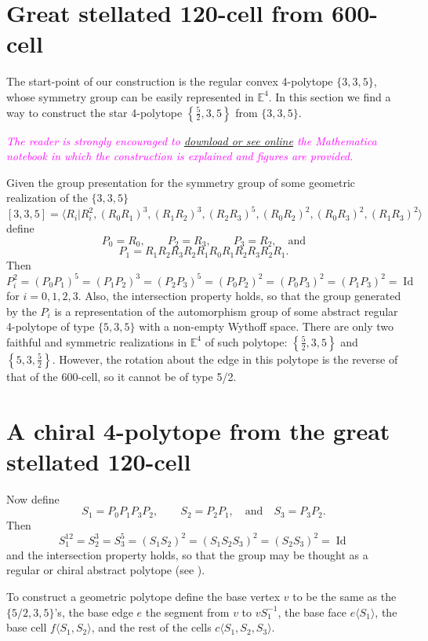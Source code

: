 \documentclass[spanish]{article}
\theoremstyle{definition}
\newcommand{\E}{\mathbb{E}}
\DeclareMathOperator{\Id}{Id}
\begin{document}
	\section{Great stellated 120-cell from 600-cell}
	The start-point of our construction is the regular convex 4-polytope $\{3,3,5\}$, whose symmetry group can be easily represented in $\E^4$.  In this section we find a way to construct the star 4-polytope $\left\{\frac{5}{2},3,5\right\}$ from $\{3,3,5\}$.
	
	\textcolor{magenta}{\textit{The reader is strongly encouraged to \href{https://www.wolframcloud.com/obj/dangcasanova/Published/chiral-4polytope.nb}{download or see online} the Mathematica notebook in which the construction is explained and figures are provided.}}
	
	Given the group presentation for the symmetry group of some geometric realization of the $\{3,3,5\}$
		\[[3,3,5]=\langle R_i|R_i^2,(R_0R_1)^3,(R_1R_2)^3,(R_2R_3)^5,(R_0R_2)^2,(R_0R_3)^2,(R_1R_3)^2\rangle\]
	define
		\[P_0=R_0,\qquad P_2=R_3,\qquad P_3=R_2,\quad\text{and}\]
		\[P_1=R_1R_2R_3R_2R_1R_0R_1R_2R_3R_2R_1.\]
	Then
		\[ P_i^2=(P_0P_1)^5=(P_1P_2)^3=(P_2P_3)^5=(P_0P_2)^2=(P_0P_3)^2=(P_1P_3)^2=\Id\]
	for $i=0,1,2,3$.
	Also, the intersection property holds, so that the group generated by the $P_i$ is a representation of the automorphism group of some abstract regular 4-polytope of type $\{5,3,5\}$ with a non-empty Wythoff space. There are only two faithful and symmetric realizations in $\mathbb{E}^4$ of such polytope: $\left\{\frac{5}{2},3,5\right\}$ and $\left\{5,3,\frac{5}{2}\right\}$. However, the rotation about the edge in this polytope is the reverse of that of the 600-cell, so it cannot be of type 5/2.
	

	\section{A chiral 4-polytope from the great stellated 120-cell}
	Now define
		\[S_1=P_0P_1P_3P_2,\qquad S_2=P_2P_1,\quad\text{and}\quad S_3=P_3P_2.\]
	Then
		\[S_1^{12}=S_2^3=S_3^5=(S_1S_2)^2=(S_1S_2S_3)^2=(S_2S_3)^2=\Id\]
	and the intersection property holds, so that the group may be thought as a regular or chiral abstract polytope (see \cite{schulte-chiral}).
	
	To construct a geometric polytope define the base vertex $v$ to be the same as the $\{5/2,3,5\}$'s, the base edge $e$ the segment from $v$ to $vS_1^{-1}$, the base face $e\langle S_1\rangle$, the base cell $f\langle S_1,S_2\rangle$, and the rest of the cells $c\langle S_1,S_2,S_3\rangle$.
	
\end{document}
